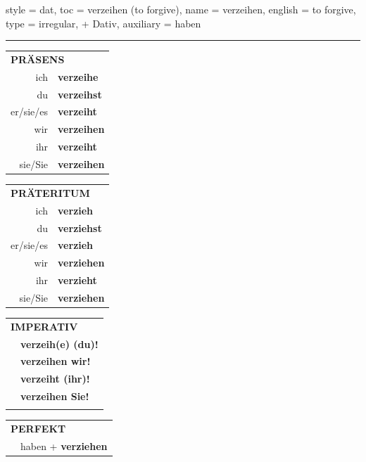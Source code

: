 \begin{verbentry}{
  style = {dat},
  toc = {verzeihen (to forgive)},
  name = {verzeihen},
  english = {to forgive},
  type = {irregular, + Dativ},
  auxiliary = {haben}
}
 
    
     \vspace{5pt}

    \hrule
    
    \vspace{5pt}

  \begin{tabular}{rl}
     \multicolumn{2}{l}{\textbf{PRÄSENS} }\\
    ich & \textbf{verzeihe}\\
    du & \textbf{verzeihst}\\
    er/sie/es & \textbf{verzeiht}\\
    wir & \textbf{verzeihen}\\
    ihr & \textbf{verzeiht}\\
    sie/Sie & \textbf{verzeihen}\\
  \end{tabular}
  \hfill
     \begin{tabular}{rl}
    \multicolumn{2}{l}{\textbf{PRÄTERITUM} }\\
    ich & \textbf{verzieh}\\
    du & \textbf{verziehst}\\
    er/sie/es & \textbf{verzieh}\\
    wir & \textbf{verziehen}\\
    ihr & \textbf{verzieht}\\
    sie/Sie & \textbf{verziehen}\\
  \end{tabular}
  \hfill
  \begin{tabular}{rl}
     \multicolumn{2}{l}{\textbf{IMPERATIV} }\\
   & \textbf{verzeih(e) (du)!}\\
   & \textbf{verzeihen wir!}\\
   & \textbf{verzeiht (ihr)!}\\
   & \textbf{verzeihen Sie!}\\
   & \vspace{10pt}
  \end{tabular}

    \vspace{10pt}

 \begin{tabular}{rl}
     \multicolumn{2}{l}{\textbf{PERFEKT}}\\
   & haben + \textbf{verziehen}\\
  \end{tabular}
\hfill
   \begin{tabular}{rl}
   

\end{tabular}
\end{verbentry}
